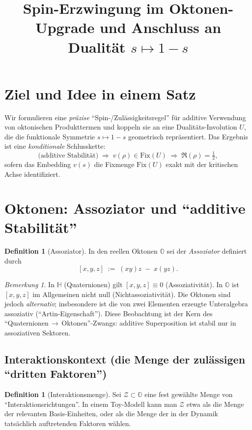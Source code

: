 \documentclass[11pt,a4paper]{article}
\title{Spin-Erzwingung im Oktonen-Upgrade und Anschluss an Dualität $s\mapsto 1-s$}
\author{}
\date{}
\theoremstyle{definition}
\newtheorem{definition}[satz]{Definition}
\theoremstyle{remark}
\newtheorem{bemerkung}[satz]{Bemerkung}
\begin{document}
	\maketitle
	
	\section{Ziel und Idee in einem Satz}
	Wir formulieren eine \emph{präzise} ``Spin-/Zulässigkeitsregel'' für additive Verwendung
	von oktonischen Produkttermen und koppeln sie an eine Dualitäts-Involution $U$,
	die die funktionale Symmetrie $s\mapsto 1-s$ geometrisch repräsentiert.
	Das Ergebnis ist eine \emph{konditionale} Schlusskette:
	\[
	\text{(additive Stabilität)} \;\Rightarrow\; v(\rho)\in \mathrm{Fix}(U)
	\;\Rightarrow\; \Re(\rho)=\tfrac12,
	\]
	sofern das Embedding $v(s)$ die Fixmenge $\mathrm{Fix}(U)$ exakt mit der kritischen Achse
	identifiziert.
	
	\section{Oktonen: Assoziator und ``additive Stabilität''}
	\begin{definition}[Assoziator]
		In den reellen Oktonen $\mathbb O$ sei der \emph{Assoziator} definiert durch
		\[
		[x,y,z]\;:=\;(xy)z \;-\; x(yz).
		\]
	\end{definition}
	
	\begin{bemerkung}
		In $\mathbb H$ (Quaternionen) gilt $[x,y,z]\equiv 0$ (Assoziativität).
		In $\mathbb O$ ist $[x,y,z]$ im Allgemeinen nicht null (Nichtassoziativität).
		Die Oktonen sind jedoch \emph{alternativ}; insbesondere ist die von zwei Elementen erzeugte
		Unteralgebra assoziativ (``Artin-Eigenschaft''). Diese Beobachtung ist der Kern des
		``Quaternionen\,$\to$\,Oktonen''-Zwangs: additive Superposition ist stabil nur in
		assoziativen Sektoren.
	\end{bemerkung}
	
	\subsection{Interaktionskontext (die Menge der zulässigen ``dritten Faktoren'')}
	\begin{definition}[Interaktionsmenge]
		Sei $\mathcal Z\subset \mathbb O$ eine fest gewählte Menge von ``Interaktionsrichtungen''.
		In einem Toy-Modell kann man $\mathcal Z$ etwa als die Menge der relevanten Basis-Einheiten,
		oder als die Menge der in der Dynamik tatsächlich auftretenden Faktoren wählen.
	\end{definition}
	
\end{document}
